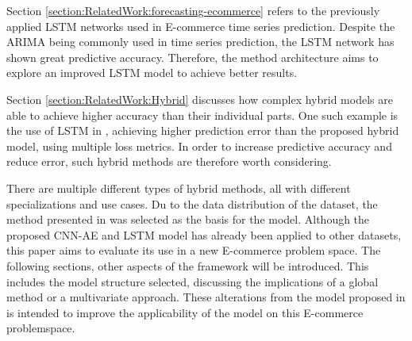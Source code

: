 Section \ref{section:RelatedWork:forecasting-ecommerce}
refers to the previously applied LSTM networks used in E-commerce time series prediction.
Despite the ARIMA being commonly used in time series prediction, the LSTM network has shown great predictive accuracy.
Therefore, the method architecture aims to explore an improved LSTM model to achieve better results.

Section \ref{section:RelatedWork:Hybrid}
discusses how complex hybrid models are able to achieve higher accuracy than their individual parts.
One such example is the use of LSTM in \cite{Zhao2019}, achieving higher prediction error than the proposed hybrid model, using multiple loss metrics.
In order to increase predictive accuracy and reduce error, such hybrid methods are therefore worth considering.


There are multiple different types of hybrid methods, all with different specializations and use cases.
Du to the data distribution of the dataset, the method presented in \cite{Zhao2019} was selected as the basis for the model.
Although the proposed CNN-AE and LSTM model has already been applied to other datasets, this paper aims to evaluate its use in a new E-commerce problem space.
The following sections, other aspects of the framework will be introduced.
This includes the model structure selected, discussing the implications of a global method or a multivariate approach.
These alterations from the model proposed in \cite{Zhao2019} is intended to improve the applicability of the model on this E-commerce problemspace.

